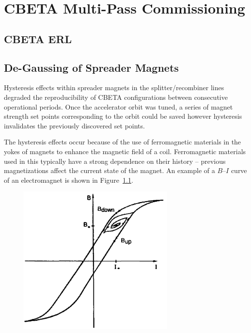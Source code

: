 \documentclass[../main.tex]{subfiles}
\begin{document}
\chapter{CBETA Multi-Pass Commissioning}
\label{CBETA_Multi-Pass_Commissioning} %

\section{CBETA ERL}

\section{De-Gaussing of Spreader Magnets}

Hysteresis effects within spreader magnets in the splitter/recombiner lines degraded the reproducibility of CBETA configurations between consecutive operational periods. Once the accelerator orbit was tuned, a series of magnet strength set points corresponding to the orbit could be saved however hysteresis invalidates the previously discovered set points.

The hysteresis effects occur because of the use of ferromagnetic materials in the yokes of magnets to enhance the magnetic field of a coil. Ferromagnetic materials used in this typically have a strong dependence on their history \cite{decker1991physical} -- previous magnetizations affect the current state of the magnet. An example of a $B$--$I$ curve of an electromagnet is shown in Figure~\ref{fig:example_BI_curve}.

\begin{figure}[!h]
\centering
\includegraphics[width=0.7\textwidth]{Figures/CBETA_Multi-Pass_Commissioning/example_BI_curve.png}
\caption{}
\label{fig:example_BI_curve}
\end{figure}
\end{document}
